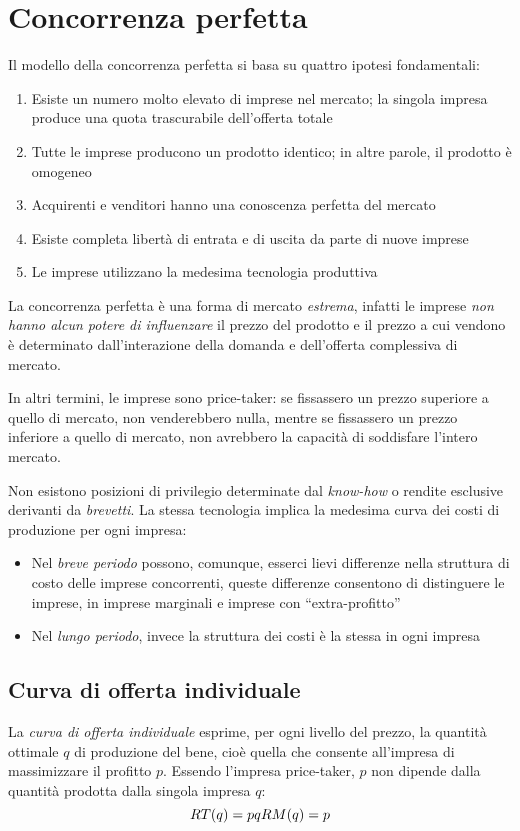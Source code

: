\section{Concorrenza perfetta}
Il modello della concorrenza perfetta si basa su quattro ipotesi fondamentali:
\begin{enumerate}
	\item Esiste un numero molto elevato di imprese nel mercato; la singola impresa produce una quota
	trascurabile dell’offerta totale
	\item Tutte le imprese producono un prodotto identico; in altre parole, il prodotto è omogeneo
	\item Acquirenti e venditori hanno una conoscenza perfetta del mercato
	\item Esiste completa libertà di entrata e di uscita da parte di nuove imprese
	\item Le imprese utilizzano la medesima tecnologia produttiva
\end{enumerate}

La concorrenza perfetta è una forma di mercato \emph{estrema}, infatti le imprese \emph{non hanno alcun potere di influenzare} il prezzo del prodotto e il prezzo a cui vendono è determinato dall’interazione della domanda e dell’offerta complessiva di
mercato.

In altri termini, le imprese sono price-taker: se fissassero un prezzo superiore a quello di mercato, non venderebbero nulla, mentre se fissassero un prezzo inferiore a quello di mercato, non avrebbero la capacità di soddisfare
l’intero mercato.

Non esistono
posizioni di privilegio determinate dal \emph{know-how} o rendite esclusive derivanti da \emph{brevetti}. La stessa
tecnologia implica la medesima curva dei costi di produzione per ogni impresa:
\begin{itemize}
	\item Nel \emph{breve periodo} possono, comunque, esserci lievi differenze nella struttura di costo delle
	imprese concorrenti, queste differenze consentono di distinguere le imprese, in imprese
	marginali e imprese con ``extra-profitto''
	\item Nel \emph{lungo periodo}, invece la struttura dei costi è la stessa in ogni impresa
\end{itemize}

\subsection{Curva di offerta individuale}
La \emph{curva di offerta individuale} esprime, per ogni livello del prezzo, la quantità ottimale $q$ di produzione
del bene, cioè quella che consente all’impresa di massimizzare il profitto $p$.
Essendo l’impresa price-taker, $p$ non dipende dalla quantità prodotta dalla singola impresa $q$:
\[
RT(q) = pq \\ RM(q) = p
\]

